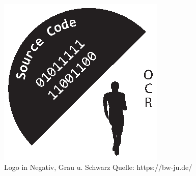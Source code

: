 \begin{figure}[!h]
\begin{minipage}[b]{0.30\textwidth}
	\end{minipage}
	\hfill
	\begin{minipage}[b]{0.20\textwidth}
		\includegraphics[width=\textwidth]{content/beispiele/images/Logo-SW.eps}
	\end{minipage}
	\caption{Logo in Negativ, Grau u. Schwarz
	  \newline Quelle: https://bw-ju.de/}\label{fig:logonegativgrauschwarz}%
\end{figure}

